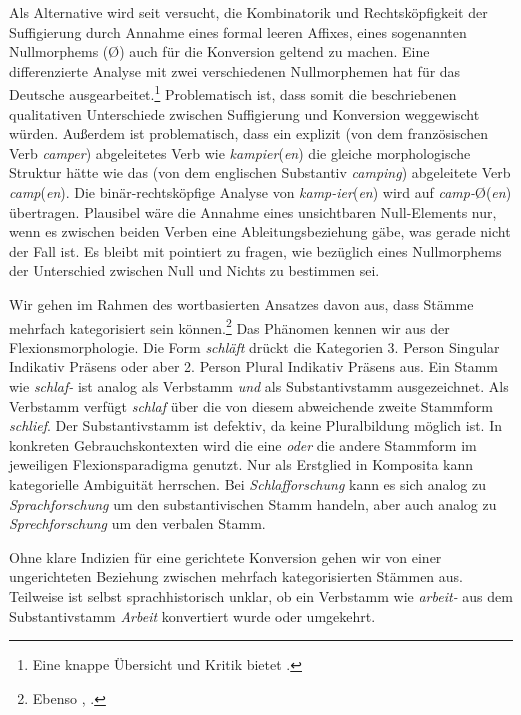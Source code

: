 Als Alternative wird seit \citet[293--296]{Marchand1969Nullaffix} versucht, die Kombinatorik und Rechtsköpfigkeit der Suffigierung durch Annahme eines formal leeren Affixes, eines sogenannten Nullmorphems (\O) auch für die Konversion geltend zu machen. Eine differenzierte Analyse mit zwei verschiedenen Nullmorphemen hat \citet[202--213]{Olsen1990Head} für das Deutsche ausgearbeitet.\footnote{Eine knappe Übersicht und Kritik bietet \citet[57--63]{Echenlohr1999}.} Problematisch ist, dass somit die beschriebenen qualitativen Unterschiede zwischen Suffigierung und Konversion weggewischt würden. Außerdem ist problematisch, dass ein explizit (von dem französischen Verb \textit{camper}) abgeleitetes Verb wie \textit{kampier}(\textit{en}) die gleiche morphologische Struktur hätte wie das (von dem englischen Substantiv \textit{camping}) abgeleitete Verb \textit{camp}(\textit{en}). Die binär-rechtsköpfige Analyse von \textit{kamp-ier}(\textit{en}) wird auf \textit{camp-}\O(\textit{en}) übertragen. Plausibel wäre die Annahme eines unsichtbaren Null-Elements nur, wenn es zwischen beiden Verben eine Ableitungsbeziehung gäbe, was gerade nicht der Fall ist. Es bleibt mit \citet[48]{Eichinger2000} pointiert zu fragen, wie bezüglich eines Nullmorphems der Unterschied zwischen Null und Nichts zu bestimmen sei.

Wir gehen im Rahmen des wortbasierten Ansatzes davon aus, dass Stämme mehrfach kategorisiert sein können.\footnote{Ebenso \citet[17]{Motsch2004}, \citet[73--75]{Echenlohr1999} \ua.} Das Phänomen kennen wir aus der Flexionsmorphologie. Die Form \textit{schläft} drückt die Kategorien 3. Person Singular Indikativ Präsens oder aber 2. Person Plural Indikativ Präsens aus. Ein Stamm wie \textit{schlaf-} ist analog als Verbstamm \textit{und} als Substantivstamm ausgezeichnet. Als Verbstamm verfügt \textit{schlaf} über die von diesem abweichende zweite Stammform \textit{schlief}. Der Substantivstamm ist defektiv, da keine Pluralbildung möglich ist. In konkreten Gebrauchskontexten wird die eine \textit{oder} die andere Stammform im jeweiligen Flexionsparadigma genutzt. Nur als Erstglied in Komposita kann kategorielle Ambiguität herrschen. Bei \textit{Schlafforschung} kann es sich analog zu \textit{Sprachforschung} um den substantivischen Stamm handeln, aber auch analog zu \textit{Sprechforschung} um den verbalen Stamm.

Ohne klare Indizien für eine gerichtete Konversion gehen wir von einer ungerichteten Beziehung zwischen mehrfach kategorisierten Stämmen aus. Teilweise ist selbst sprachhistorisch unklar, ob ein Verbstamm wie \textit{arbeit-} aus dem Substantivstamm \textit{Arbeit} konvertiert wurde oder umgekehrt.  

